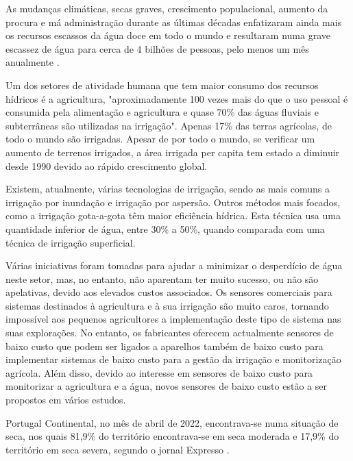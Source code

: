 \documentclass[conference]{IEEEtran}
\begin{document}
As mudanças climáticas, secas graves, crescimento populacional, aumento da 
procura e má administração durante as últimas décadas enfatizaram ainda mais 
os recursos escassos da água doce em todo o mundo e resultaram numa grave 
escassez de água para cerca de 4 bilhões de pessoas, pelo menos um mês 
anualmente \cite{jafari2018assessing} \cite{unicef2019progress} \cite{orimoloye2021spatial}. \cite{salehi2022global}

Um dos setores de atividade humana que tem maior consumo dos recursos hídricos 
é a agricultura, "aproximadamente 100 vezes mais do que o uso pessoal é consumida 
pela alimentação e agricultura e quase 70\% das águas fluviais e subterrâneas 
são utilizadas na irrigação". \cite{nawandar2019iot} Apenas 17\% das terras 
agrícolas, de todo o mundo são irrigadas. Apesar de por todo o mundo, se verificar 
um aumento de terrenos irrigados, a área irrigada per capita tem estado a diminuir 
desde 1990 devido ao rápido crescimento global. \cite{pimentelwater}

Existem, atualmente, várias tecnologias de irrigação, sendo as mais comuns 
a irrigação por inundação e irrigação por aspersão. Outros métodos mais 
focados, como a irrigação gota-a-gota têm maior eficiência hídrica. Esta 
técnica usa uma quantidade inferior de água, entre 30\% a 50\%, quando 
comparada com uma técnica de irrigação superficial. \cite{pimentelwater}

Várias iniciativas foram tomadas para ajudar a minimizar o desperdício 
de água neste setor, mas, no entanto, não aparentam ter muito sucesso, 
ou não são apelativas, devido aos elevados custos associados. 
Os sensores comerciais para sistemas destinados à agricultura e à sua 
irrigação são muito caros, tornando impossível aos pequenos agricultores 
a implementação deste tipo de sistema nas suas explorações. No entanto, 
os fabricantes oferecem actualmente sensores de baixo custo que podem 
ser ligados a aparelhos também de baixo custo para implementar sistemas de baixo custo para a gestão da 
irrigação e monitorização agrícola. Além disso, devido ao interesse em 
sensores de baixo custo para monitorizar a agricultura e a água, 
novos sensores de baixo custo estão a ser propostos em vários estudos. \cite{garcia2020iot}

Portugal Continental, no mês de abril de 2022, encontrava-se numa situação de seca, nos 
quais 81,9\% do território encontrava-se em seca moderada e 17,9\% do território em seca severa, 
segundo o jornal Expresso \cite{expresso}. 
\end{document}
